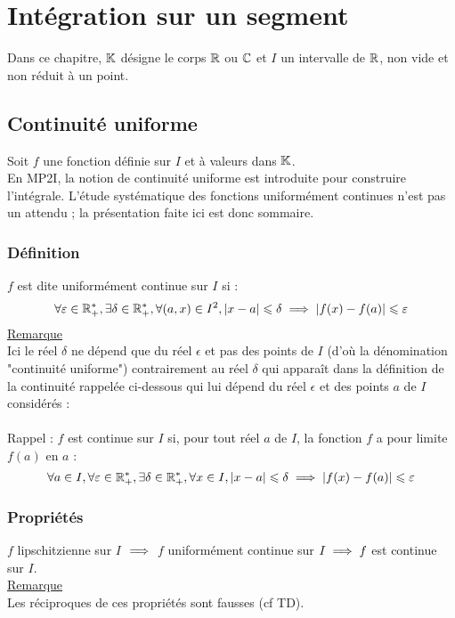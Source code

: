 \chapter{Intégration sur un segment}

\minitoc
Dans ce chapitre, \(\mathbb{K}\) désigne le corps \(\mathbb{R}\) ou \(\mathbb{C}\) et \(I\) un intervalle de \(\mathbb{R}\), non vide et non réduit à un point.

\section{Continuité uniforme}
    Soit \(f\) une fonction définie sur \(I\) et à valeurs dans \(\mathbb{K}\).\\
    En MP2I, la notion de continuité uniforme est introduite pour construire l’intégrale. L’étude systématique des fonctions uniformément continues n’est pas un attendu ; la présentation faite ici est donc sommaire.

\subsection{Définition}
\begin{defi}
    
\end{defi}
    \(f\) est dite uniformément continue sur \(I\) si :
    \[\forall \varepsilon  \in  \mathbb{R}_+^*, \exists \delta  \in  \mathbb{R}_+^*, \forall (a, x) \in  I^2, \left\lvert x -  a\right\rvert \leqslant \delta  \implies \left\lvert f (x) -  f (a)\right\rvert \leqslant \varepsilon \]
    \underline{Remarque}\\
    Ici le réel \(\delta\)  ne dépend que du réel \(\epsilon\)  et pas des points de \(I\) (d’où la dénomination "continuité uniforme") contrairement au réel \(\delta\)  qui apparaît dans la définition de la continuité rappelée ci-dessous qui lui dépend du réel \(\epsilon\)  et des points \(a\) de \(I\) considérés :\\~\\
    Rappel : \(f\) est continue sur \(I\) si, pour tout réel \(a\) de \(I\), la fonction \(f\) a pour limite \(f (a) \) en \(a\) :
    \[\forall a \in  I, \forall \varepsilon  \in  \mathbb{R}_+^* , \exists \delta  \in  \mathbb{R}_+^*, \forall x \in  I, \left\lvert x -  a\right\rvert \leqslant \delta  \implies \left\lvert f (x) -  f (a)\right\rvert \leqslant \varepsilon\] 
\subsection{Propriétés}
\begin{prop}
    \(f\) lipschitzienne sur \(I\) \(\implies\) \(f\) uniformément continue sur \(I \implies f\) est continue sur \(I\).\\
    \underline{Remarque}\\
    Les réciproques de ces propriétés sont fausses (cf TD).
\end{prop}
